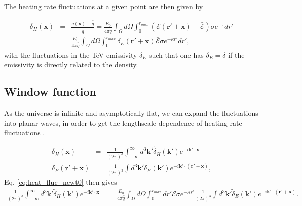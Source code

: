 \documentclass[twocolumns]{emulateapj}
\begin{document}
{The heating rate fluctuations at a given point are then given by 

\begin{eqnarray}
  \label{eq:heat_fluc_newt0}
  \delta_H(\mathbf{x})&=&\frac{\dot{q}(\mathbf{x})-\bar{\dot{q}}}{\bar{\dot{q}}}=\frac{E_0}{4\pi\bar{\dot{q}}} \int_{\Omega}d\Omega\int_0^{r_{max}}   (\mathcal{E}(\mathbf{r}'+\mathbf{x})-\bar{\mathcal{E}}) \sigma  e^{-\tau} dr' \\ \nonumber
  &=&\frac{E_0}{4\pi\bar{\dot{q}}}\int_{\Omega}d\Omega\int_0^{r_{max}}   \delta_E(\mathbf{r}'+\mathbf{x})\bar{\mathcal{E}}\sigma  e^{-\kappa r'}dr',
\end{eqnarray}
with the fluctuations in the TeV emissivity $\delta_E$ such that one has $\delta_E=\delta$ if the emissivity is directly related to the density.



\subsection{Window function}
As the universe is infinite and asymptotically flat, we can expand the fluctuations into planar waves, in order to get the lengthscale dependence of heating rate fluctuations \citep{2004MNRAS.352..142B}.

\begin{eqnarray}
  \label{eq:FT_delta}
  \delta_H(\mathbf{x})&=&\frac{1}{(2\pi)^3}\int_{-\infty}^{\infty} d^3\mathbf{k'} \tilde{\delta}_H(\mathbf{k'}) e^{-i\mathbf{k'}\cdot\mathbf{x}}\\ \nonumber
  \delta_E(\mathbf{r}'+\mathbf{x})&=&\frac{1}{(2\pi)^3}\int d^3\mathbf{k'} \tilde{\delta}_E(\mathbf{k'}) e^{-i\mathbf{k'}\cdot(\mathbf{r'}+\mathbf{x})},
\end{eqnarray}
Eq. \ref{eq:heat_fluc_newt0} then gives
\begin{eqnarray}
  \label{eq:heat_fluc_newt1}
\frac{1}{(2\pi)^3}\int_{-\infty}^{\infty} d^3\mathbf{k'} \tilde{\delta}_H(\mathbf{k'}) e^{-i\mathbf{k'}\cdot\mathbf{x}}&=&\frac{E_0}{4\pi\bar{\dot{q}}} \int_{\Omega}d\Omega\int_0^{r_{max}}  dr' \bar{\mathcal{E}}\sigma  e^{-\kappa r'}  \frac{1}{(2\pi)^3}\int d^3\mathbf{k'} \tilde{\delta}_E(\mathbf{k'}) e^{-i\mathbf{k'}\cdot(\mathbf{r'}+\mathbf{x})}.
\end{eqnarray}

}
\end{document}
